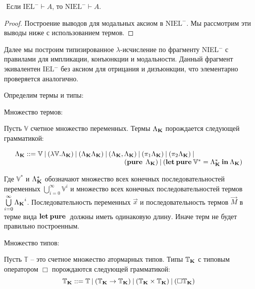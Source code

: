 \begin{lemma}
$ $
Если $\text{IEL}^{-} \vdash A$, то $\text{NIEL}^{-} \vdash A$.
\end{lemma}

\begin{proof}
Построение выводов для модальных аксиом в $\text{NIEL}^{-}$. Мы рассмотрим эти выводы ниже с использованием термов.
\end{proof}

\vspace{\baselineskip}

Далее мы построим типизированное $\lambda$-исчисление по фрагменту NIEL$^{-}$ с правилами для импликации, конъюнкции и модальности.
Данный фрагмент экивалентен IEL$^{-}$ без аксиом для отрицания и дизъюнкции, что элементарно проверяется аналогично.

Определим термы и типы:

\vspace{\baselineskip}

\begin{defin} Множество термов:

Пусть $\mathbb{V}$ счетное множество переменных. Термы $\Lambda_{{\bf K}}$ порождается следующей грамматикой:

$\begin{array}{lll}
& \Lambda_{{\bf K}} ::= \mathbb{V} \: | \:  (\lambda \mathbb{V}.\Lambda_{{\bf K}}) \: | \: (\Lambda_{{\bf K}}\Lambda_{{\bf K}}) \: | \: (\Lambda_{{\bf K}} , \Lambda_{{\bf K}}) \: | \: (\pi_1 \Lambda_{{\bf K}}) \: | \: (\pi_2 \Lambda_{{\bf K}}) \: | & \\
& \quad\quad\quad\quad\quad\quad\quad\quad\quad\quad\quad\quad\quad\quad\quad\quad ({\bf pure \: } \: \Lambda_{{\bf K}}) \: | \: ({\bf let \: pure \:} \mathbb{V}^{*} = \Lambda_{{\bf K}}^{*} {\: \bf in \:} \Lambda_{{\bf K}})
\end{array}$

\end{defin}

Где $\mathbb{V}^{*}$ и $\Lambda_{{\bf K}}^{*}$ обозначают множество всех конечных последовательностей переменных $\bigcup \limits_{i=0}^{\infty} \mathbb{V}^i$
и множество всех конечных последовательностей термов $\bigcup \limits_{i = 0}^{\infty} {\Lambda_{{\bf K}}}^i $. Последовательность переменных $\vec{x}$ и последовательность термов $\vec{M}$ в терме вида ${\bf let \: pure \:}$ должны иметь одинаковую длину.
Иначе терм не будет правильно построенным.

\begin{defin} Множество типов:

Пусть $\mathbb{T}$ -- это счетное множество атормарных типов. Типы $\mathbb{T}_{{\bf K}}$ с типовым оператором $\Box$ порождаются следующей грамматикой:
\begin{equation}
  \mathbb{T}_{{\bf K}} ::= \mathbb{T} \: | \: (\mathbb{T}_{{\bf K}} \to \mathbb{T}_{{\bf K}}) \: |
  \: (\mathbb{T}_{{\bf K}} \times \mathbb{T}_{{\bf K}}) \: | \: (\Box \mathbb{T}_{{\bf K}})
\end{equation}
\end{defin}

